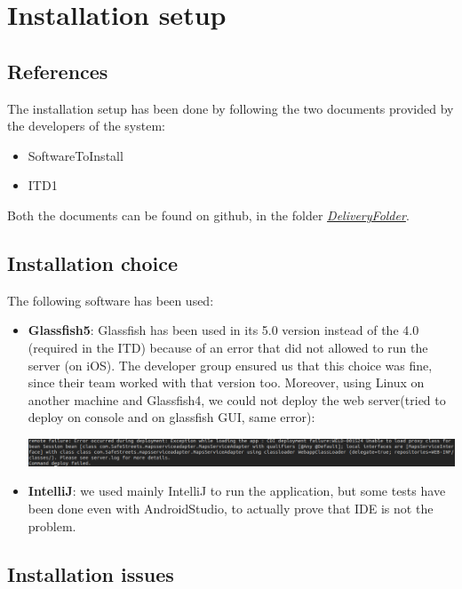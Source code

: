 \documentclass[../ATD.tex]{subfiles}
\begin{document}
    \chapter{Installation setup}\label{ch:installation-setup}
    \section{References}\label{sec:references}
    The installation setup has been done by following the two documents provided by the developers of the system:
    \begin{itemize}
        \item SoftwareToInstall
        \item ITD1
    \end{itemize}
    Both the documents can be found on github, in the folder \href{https://github.com/gianfi12/AbboAccordiBonetti/tree/master/DeliveryFolder}{\emph{DeliveryFolder}}.

    \section{Installation choice}\label{sec:installation-choice}
    The following software has been used:
    \begin{itemize}
        \item \textbf{Glassfish5}: Glassfish has been used in its 5.0 version instead of the 4.0 (required in the ITD) because of an error that did not allowed to run the server (on iOS).
        The developer group ensured us that this choice was fine, since their team worked with that version too.
        Moreover, using Linux on another machine and Glassfish4, we could not deploy the web server(tried to deploy on console and on glassfish GUI, same error):

        \includegraphics[scale = 0.35]{assets/deployError.png}

        \item \textbf{IntelliJ}: we used mainly IntelliJ to run the application, but some tests have been done even with AndroidStudio, to actually prove that
        IDE is not the problem.
    \end{itemize}
    \newpage
    \section{Installation issues}\label{sec:installation-issues}
\end{document}
